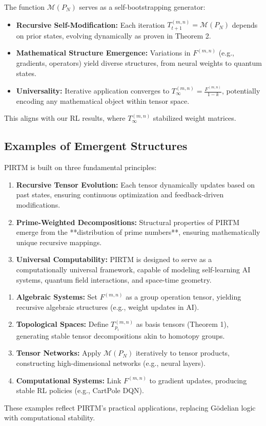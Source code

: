 \documentclass{article}
\theoremstyle{plain}
\begin{document}
The function \( \mathcal{M}(P_N) \) serves as a self-bootstrapping generator:
\begin{itemize}
    \item \textbf{Recursive Self-Modification:} Each iteration \( T_{t+1}^{(m,n)} = \mathcal{M}(P_N) \) depends on prior states, evolving dynamically as proven in Theorem 2.
    \item \textbf{Mathematical Structure Emergence:} Variations in \( F^{(m,n)} \) (e.g., gradients, operators) yield diverse structures, from neural weights to quantum states.
    \item \textbf{Universality:} Iterative application converges to \( T_\infty^{(m,n)} = \frac{F^{(m,n)}}{1 - k} \), potentially encoding any mathematical object within tensor space.
\end{itemize}
This aligns with our RL results, where \( T_\infty^{(m,n)} \) stabilized weight matrices.

\subsection{Examples of Emergent Structures}

PIRTM is built on three fundamental principles:
\begin{enumerate}
    \item \textbf{Recursive Tensor Evolution:} Each tensor dynamically updates based on past states, ensuring continuous optimization and feedback-driven modifications.
    \item \textbf{Prime-Weighted Decompositions:} Structural properties of PIRTM emerge from the **distribution of prime numbers**, ensuring mathematically unique recursive mappings.
    \item \textbf{Universal Computability:} PIRTM is designed to serve as a computationally universal framework, capable of modeling self-learning AI systems, quantum field interactions, and space-time geometry.
\end{enumerate}
\begin{enumerate}
    \item \textbf{Algebraic Systems:} Set \( F^{(m,n)} \) as a group operation tensor, yielding recursive algebraic structures (e.g., weight updates in AI).
    \item \textbf{Topological Spaces:} Define \( T_{p_i}^{(m,n)} \) as basis tensors (Theorem 1), generating stable tensor decompositions akin to homotopy groups.
    \item \textbf{Tensor Networks:} Apply \( \mathcal{M}(P_N) \) iteratively to tensor products, constructing high-dimensional networks (e.g., neural layers).
    \item \textbf{Computational Systems:} Link \( F^{(m,n)} \) to gradient updates, producing stable RL policies (e.g., CartPole DQN).
\end{enumerate}
These examples reflect PIRTM’s practical applications, replacing Gödelian logic with computational stability.
\end{document}
